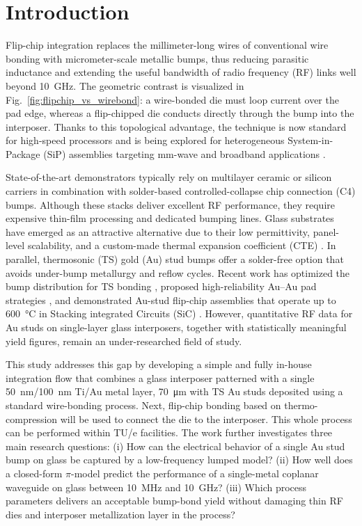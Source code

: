 \documentclass[conference]{IEEEtran}
\begin{document}
\section{Introduction}
Flip-chip integration replaces the millimeter-long wires of conventional wire bonding with micrometer-scale metallic bumps, thus reducing parasitic inductance and extending the useful bandwidth of radio frequency (RF) links well beyond \SI{10}{\giga\hertz}.  The geometric contrast is visualized in Fig.~\ref{fig:flipchip_vs_wirebond}: a wire-bonded die must loop current over the pad edge, whereas a flip-chipped die conducts directly through the bump into the interposer.  Thanks to this topological advantage, the technique is now standard for high-speed processors and is being explored for heterogeneous System-in-Package (SiP) assemblies targeting mm-wave and broadband applications \cite{Lau2016,Heinrich2005}.

State-of-the-art demonstrators typically rely on multilayer ceramic or silicon carriers in combination with solder-based controlled-collapse chip connection (C4) bumps.  Although these stacks deliver excellent RF performance, they require expensive thin-film processing and dedicated bumping lines.  Glass substrates have emerged as an attractive alternative due to their low permittivity, panel-level scalability, and a custom-made thermal expansion coefficient (CTE) \cite{Keech2013}.  In parallel, thermosonic (TS) gold (Au) stud bumps offer a solder-free option that avoids under-bump metallurgy and reflow cycles.  Recent work has optimized the bump distribution for TS bonding \cite{Chang2022}, proposed high-reliability Au–Au pad strategies \cite{Yan2024}, and demonstrated Au-stud flip-chip assemblies that operate up to \SI{600}{\celsius} in Stacking integrated Circuits (SiC) \cite{Li2024}.  However, quantitative RF data for Au studs on single-layer glass interposers, together with statistically meaningful yield figures, remain an under-researched field of study.

This study addresses this gap by developing a simple and fully in-house integration flow that combines a glass interposer patterned with a single \SI{50}{\nano\metre}/\SI{100}{\nano\metre} Ti/Au metal layer, \SI{70}{\micro\metre} with TS Au studs deposited using a standard wire-bonding process. Next, flip-chip bonding based on thermo-compression will be used to connect the die to the interposer.  This whole process can be performed within TU/e facilities. The work further investigates three main research questions: (i) How can the electrical behavior of a single Au stud bump on glass be captured by a low-frequency lumped model? (ii) How well does a closed-form $\pi$-model predict the performance of a single-metal coplanar waveguide on glass between \SI{10}{\mega\hertz} and \SI{10}{\giga\hertz}? (iii) Which process parameters delivers an acceptable bump-bond yield without damaging thin RF dies and interposer metallization layer in the process?
\end{document}
